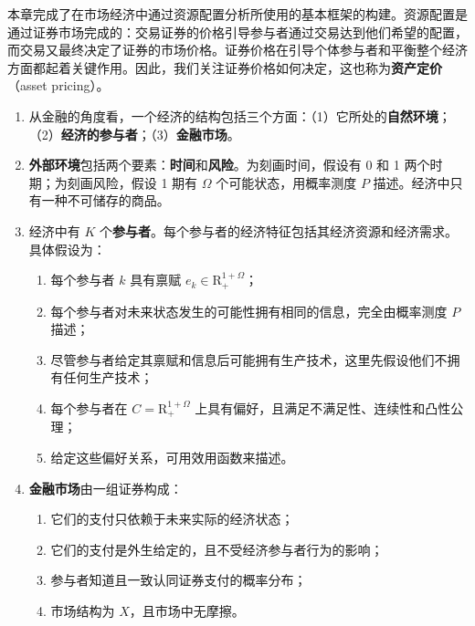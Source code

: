 \WJChapterSummary
\begin{tcolorbox}[summary]

本章完成了在市场经济中通过资源配置分析所使用的基本框架的构建。资源配置是通过证券市场完成的：交易证券的价格引导参与者通过交易达到他们希望的配置，而交易又最终决定了证券的市场价格。证券价格在引导个体参与者和平衡整个经济方面都起着关键作用。因此，我们关注证券价格如何决定，这也称为\textbf{资产定价}（asset pricing）。

\begin{enumerate}
    \item 从金融的角度看，一个经济的结构包括三个方面：（1）它所处的\textbf{自然环境}；（2）\textbf{经济的参与者}；（3）\textbf{金融市场}。

    \item \textbf{外部环境}包括两个要素：\textbf{时间}和\textbf{风险}。为刻画时间，假设有 0 和 1 两个时期；为刻画风险，假设 1 期有 $\Omega$ 个可能状态，用概率测度 $P$ 描述。经济中只有一种不可储存的商品。

    \item 经济中有 $K$ 个\textbf{参与者}。每个参与者的经济特征包括其经济资源和经济需求。具体假设为：
    \begin{enumerate}[label=(\alph*)]
        \item 每个参与者 $k$ 具有禀赋 $e_k\in\mathrm{R}^{1+\Omega}_{+}$；
        \item 每个参与者对未来状态发生的可能性拥有相同的信息，完全由概率测度 $P$ 描述；
        \item 尽管参与者给定其禀赋和信息后可能拥有生产技术，这里先假设他们不拥有任何生产技术；
        \item 每个参与者在 $C=\mathrm{R}^{1+\Omega}_{+}$ 上具有偏好，且满足不满足性、连续性和凸性公理；
        \item 给定这些偏好关系，可用效用函数来描述。
    \end{enumerate}

    \item \textbf{金融市场}由一组证券构成：
    \begin{enumerate}[label=(\alph*)]
        \item 它们的支付只依赖于未来实际的经济状态；
        \item 它们的支付是外生给定的，且不受经济参与者行为的影响；
        \item 参与者知道且一致认同证券支付的概率分布；
        \item 市场结构为 $X$，且市场中无摩擦。
    \end{enumerate}


\end{enumerate}
\end{tcolorbox}
